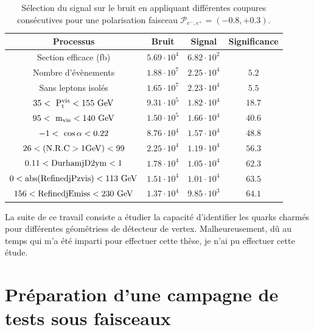     \begin{table}
    \begin{tabular}{c c c c}
      \hline
      Processus                                     & Bruit        & Signal              & Significance  \tabularnewline
      \hline
      \hline
      Section efficace (fb)                          & $5.69 \cdot 10^{4}$ & $6.82 \cdot 10^{2}$ &               \tabularnewline
      Nombre d'évènements                       & $1.88 \cdot 10^{7}$ & $2.25 \cdot 10^{4}$ & $5.2$         \tabularnewline
      Sans leptons isolés                         & $1.65 \cdot 10^{7}$ & $2.23 \cdot 10^{4}$ & $5.5$         \tabularnewline
      {$35 <~\rm{{P}_{t}^{vis}} < 155~\rm{GeV} $} & $9.31 \cdot 10^{5}$ & $1.82 \cdot 10^{4}$ & $18.7$        \tabularnewline
      {$95 <~\rm{m_{vis}}< 140~\rm{GeV}$}         & $1.50 \cdot 10^{5}$ & $1.66 \cdot 10^{4}$ & $40.6$        \tabularnewline
      {$-1 <~\rm{\cos{\alpha}}< 0.22$}            & $8.76 \cdot 10^{4}$ & $1.57 \cdot 10^{4}$ & $48.8$        \tabularnewline
      $26 < (\rm{N.R.C > 1GeV}) < 99$                    & $2.25 \cdot 10^{4}$ & $1.19 \cdot 10^{4}$ & $56.3$        \tabularnewline
      $0.11 < \rm{DurhamjD2ym} < 1$               & $1.78 \cdot 10^{4}$ & $1.05 \cdot 10^{4}$ & $62.3$        \tabularnewline
      $0 < \rm{abs(RefinedjPzvis)} < 113~\rm{GeV}$& $1.51 \cdot 10^{4}$ & $1.01 \cdot 10^{4}$ & $63.5$        \tabularnewline
      $156 < \rm{RefinedjEmiss} < 230~\rm{GeV}$   & $1.37 \cdot 10^{4}$ & $9.85 \cdot 10^{3}$ & $64.1$        \tabularnewline      
    \end{tabular}
    \caption{Sélection du signal sur le bruit en appliquant différentes coupures consécutives pour une polarisation faisceau $\mathcal{P}_{e^{-},e^{+}} = (-0.8, +0.3)$.}
    \label{tab:cutFlow_resume}
  \end{table}

  La suite de ce travail consiste a étudier la capacité d'identifier les quarks charmés pour différentes géométriess de détecteur de vertex. 
  Malheureusement, dû au temps qui m'a été imparti pour effectuer cette thèse, je n'ai pu effectuer cette étude.

  \section{Préparation d'une campagne de tests sous faisceaux}

